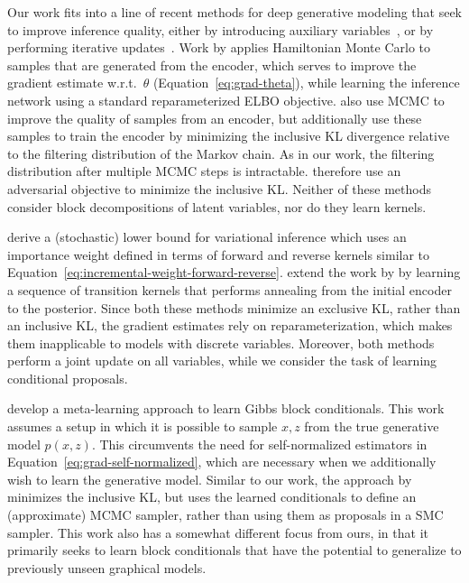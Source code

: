 \documentclass{article}
\theoremstyle{definition}
\begin{document}
Our work fits into a line of recent methods for deep generative modeling that seek to improve inference quality, either by introducing auxiliary variables~\cite{maaloe2016auxiliary, ranganath2016hierarchical}, or by performing iterative updates~\cite{marino2018iterative}. Work by \citet{hoffman2017learning} applies Hamiltonian Monte Carlo to samples that are generated from the encoder, which serves to improve the gradient estimate w.r.t.~$\theta$ (Equation~\ref{eq:grad-theta}), while learning the inference network using a standard reparameterized ELBO objective. \citet{li2017approximate} also use MCMC to improve the quality of samples from an encoder, but additionally use these samples to train the encoder by minimizing the inclusive KL divergence relative to the filtering distribution of the Markov chain. As in our work, the filtering distribution after multiple MCMC steps is intractable. \citet{li2017approximate} therefore use an adversarial objective to minimize the inclusive KL. Neither of these methods consider block decompositions of latent variables, nor do they learn kernels. 


\citet{salimans2015markov} derive a (stochastic) lower bound for variational inference which uses an importance weight defined in terms of forward and reverse kernels similar to Equation~\ref{eq:incremental-weight-forward-reverse}.
\citet{huang2018improving} extend the work by \citet{salimans2015markov} by learning a sequence of transition kernels that performs annealing from the initial encoder to the posterior. 
Since both these methods minimize an exclusive KL, rather than an inclusive KL, the gradient estimates rely on reparameterization, which makes them inapplicable to models with discrete variables. 
Moreover, both methods perform a joint update on all variables, while we consider the task of learning conditional proposals.


\citet{wang2018meta} develop a meta-learning approach to learn Gibbs block conditionals. This work assumes a setup in which it is possible to sample $x, z$ from the true generative model $p(x,z)$. This circumvents the need for self-normalized estimators in Equation~\ref{eq:grad-self-normalized}, which are necessary when we additionally wish to learn the generative model. Similar to our work, the approach by \citet{wang2018meta} minimizes the inclusive KL, but uses the learned conditionals to define an (approximate) MCMC sampler, rather than using them as proposals in a SMC sampler. This work also has a somewhat different focus from ours, in that it primarily seeks to learn block conditionals that have the potential to generalize to previously unseen graphical models.
\end{document}
